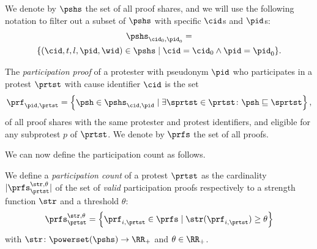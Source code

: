 We denote by \(\pshs\) the set of all proof shares,
and we will use the following notation to filter out a subset of \(\pshs\) with specific \(\cid\)s and \(\pid\)s:
\begin{multline*}
  \pshs_{\cid_0, \pid_0} = \\
  \{(\cid, t, l, \pid, \wid)\in \pshs\mid \cid = \cid_0 \land \pid = \pid_0\}.
\end{multline*}

\begin{definition}%
  \label{DefParticipationProof}\label{DefParticipationProofs}
  The \emph{participation proof} of a protester with pseudonym \(\pid\) who participates in a protest \(\prtst\) with cause identifier \(\cid\) is the 
  set
  \begin{equation}
    \nonumber
    \prf_{\pid, \prtst} =
    \left\{ \psh \in \pshs_{\cid, \pid} \mid
      \exists \sprtst\in \prtst\colon \psh\sqsubseteq \sprtst \right\},
  \end{equation}
  of all proof shares with the same protester and protest identifiers, and eligible for any subprotest $p$ of $\prtst$.
  We denote by \(\prfs\) the set of all proofs.
\end{definition}


We can now define the participation count as follows.
\begin{definition}%
  \label{DefParticipationCount}
  We define a \emph{participation count} of a protest \(\prtst\) as the cardinality 
  \(|\prfs_{\prtst}^{\str,\theta}|\) of the set of \emph{valid} participation proofs respectively to a strength function $\str$ and a threshold $\theta$: \[
    \prfs_{\prtst}^{\str,\theta} = \left\{ \prf_{i,\prtst} \in \prfs \mid
      \str(\prf_{i,\prtst})\geq \theta \right\}
  \] with \(\str\colon \powerset(\pshs)\to \RR_+\) and  \(\theta \in \RR_+\).
\end{definition}

